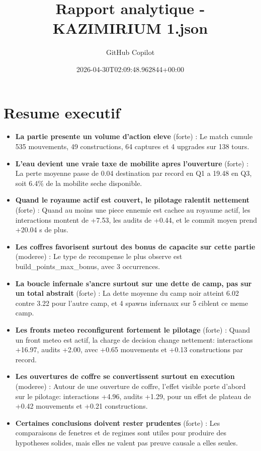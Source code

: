 \documentclass[11pt,a4paper]{article}
\begin{document}
\title{Rapport analytique - KAZIMIRIUM 1.json}
\author{GitHub Copilot}
\date{2026-04-30T02:09:48.962844+00:00}
\maketitle
\tableofcontents
\newpage
\section*{Resume executif}
\begin{itemize}
\item \textbf{La partie presente un volume d'action eleve} (forte) : Le match cumule 535 mouvements, 49 constructions, 64 captures et 4 upgrades sur 138 tours.
\item \textbf{L'eau devient une vraie taxe de mobilite apres l'ouverture} (forte) : La perte moyenne passe de 0.04 destination par record en Q1 a 19.48 en Q3, soit 6.4\% de la mobilite seche disponible.
\item \textbf{Quand le royaume actif est couvert, le pilotage ralentit nettement} (forte) : Quand au moins une piece ennemie est cachee au royaume actif, les interactions montent de +7.53, les audits de +0.44, et le commit moyen prend +20.04 s de plus.
\item \textbf{Les coffres favorisent surtout des bonus de capacite sur cette partie} (moderee) : Le type de recompense le plus observe est build\_points\_max\_bonus, avec 3 occurrences.
\item \textbf{La boucle infernale s'ancre surtout sur une dette de camp, pas sur un total abstrait} (forte) : La dette moyenne du camp noir atteint 6.02 contre 3.22 pour l'autre camp, et 4 spawns infernaux sur 5 ciblent ce meme camp.
\item \textbf{Les fronts meteo reconfigurent fortement le pilotage} (forte) : Quand un front meteo est actif, la charge de decision change nettement: interactions +16.97, audits +2.00, avec +0.65 mouvements et +0.13 constructions par record.
\item \textbf{Les ouvertures de coffre se convertissent surtout en execution} (moderee) : Autour de une ouverture de coffre, l'effet visible porte d'abord sur le pilotage: interactions +4.96, audits +1.29, pour un effet de plateau de +0.42 mouvements et +0.21 constructions.
\item \textbf{Certaines conclusions doivent rester prudentes} (forte) : Les comparaisons de fenetres et de regimes sont utiles pour produire des hypotheses solides, mais elles ne valent pas preuve causale a elles seules.
\end{itemize}
\end{document}
